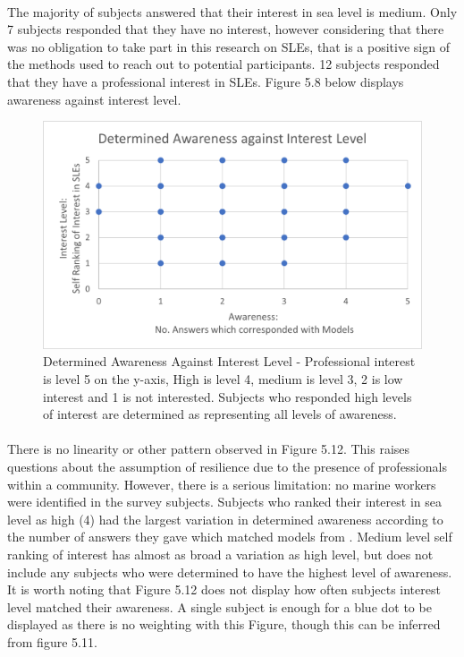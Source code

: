 \paragraph{}

The majority of subjects answered that their interest in sea level is medium. Only 7 subjects responded that they have no interest, however considering that there was no obligation to take part in this research on SLEs, that is a positive sign of the methods used to reach out to potential participants. 12 subjects responded that they have a professional interest in SLEs. Figure 5.8 below displays awareness against interest level.

\begin{figure}[H]
    \centering
    \includegraphics{fig_results/aware_vs_interest.png}
    \caption{Determined Awareness Against Interest Level -  Professional interest is level 5 on the y-axis, High  is level 4, medium is level 3, 2 is low interest and 1 is not interested. Subjects who responded high levels of interest are determined as representing all levels of awareness.}
    \label{fig:aware_vs_interest}
\end{figure}
\paragraph{}

There is no linearity or other pattern observed in Figure 5.12. This raises questions about the assumption of resilience due to the presence of professionals within a community. However, there is a serious limitation: no marine workers were identified in the survey subjects. Subjects who ranked their interest in sea level as high (4) had the largest variation in determined awareness according to the number of answers they gave which matched models from \cite{kartverket_se_2020}. Medium level self ranking of interest has almost as broad a variation as high level, but does not include any subjects who were determined to have the highest level of awareness. It is worth noting  that Figure 5.12 does not display how often subjects interest level matched their awareness. A single subject is enough for a blue dot to be displayed as there is no weighting with this Figure, though this can be inferred from figure 5.11. 



